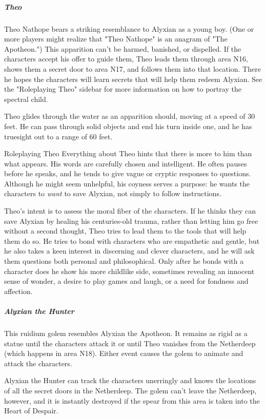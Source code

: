 \documentclass[10pt,a4paper,twoside,fancy,bg=print,twocolumn,openany,nodeprecatedcode]{dndbook}
\begin{document}
\subparagraph{Theo}
Theo Nathope bears a striking resemblance to Alyxian as a young boy. (One or more players might realize that "Theo Nathope" is an anagram of "The Apotheon.") This apparition can't be harmed, banished, or dispelled. If the characters accept his offer to guide them, Theo leads them through area N16, shows them a secret door to area N17, and follows them into that location. There he hopes the characters will learn secrets that will help them redeem Alyxian. See the "Roleplaying Theo" sidebar for more information on how to portray the spectral child.

Theo glides through the water as an apparition should, moving at a speed of 30 feet. He can pass through solid objects and end his turn inside one, and he has truesight out to a range of 60 feet.

\begin{DndSidebar}[float=!b]{Roleplaying Theo}
Everything about Theo hints that there is more to him than what appears. His words are carefully chosen and intelligent. He often pauses before he speaks, and he tends to give vague or cryptic responses to questions. Although he might seem unhelpful, his coyness serves a purpose: he wants the characters to \textit{want} to save Alyxian, not simply to follow instructions.



Theo's intent is to assess the moral fiber of the characters. If he thinks they can save Alyxian by healing his centuries-old trauma, rather than letting him go free without a second thought, Theo tries to lead them to the tools that will help them do so. He tries to bond with characters who are empathetic and gentle, but he also takes a keen interest in discerning and clever characters, and he will ask them questions both personal and philosophical. Only after he bonds with a character does he show his more childlike side, sometimes revealing an innocent sense of wonder, a desire to play games and laugh, or a need for fondness and affection.



\end{DndSidebar}

\subparagraph{Alyxian the Hunter}
This ruidium golem resembles Alyxian the Apotheon. It remains as rigid as a statue until the characters attack it or until Theo vanishes from the Netherdeep (which happens in area N18). Either event causes the golem to animate and attack the characters.

Alyxian the Hunter can track the characters unerringly and knows the locations of all the secret doors in the Netherdeep. The golem can't leave the Netherdeep, however, and it is instantly destroyed if the spear from this area is taken into the Heart of Despair.
\end{document}
